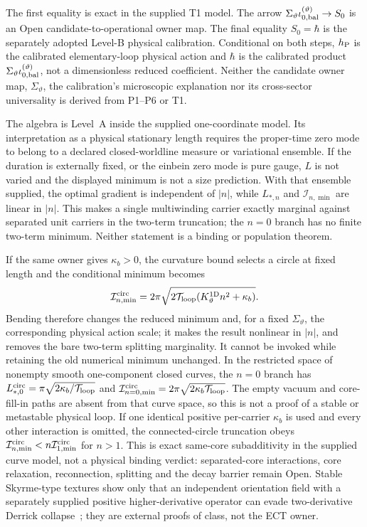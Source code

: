 \documentclass[11pt,a4paper]{article}
\begin{document}
The first equality is exact in the supplied T1 model.  The arrow
$\Sigma_\vartheta\iota_{0,\rm bal}^{(\vartheta)}\to S_0$ is an Open
candidate-to-operational owner map.  The final equality $S_0=\hbar$ is the
separately adopted Level-B physical calibration.  Conditional on both steps,
$h_{\rm P}$ is the calibrated elementary-loop physical action and $\hbar$ is
the calibrated product
$\Sigma_\vartheta\iota_{0,\rm bal}^{(\vartheta)}$, not a dimensionless reduced
coefficient.  Neither the candidate owner map, $\Sigma_\vartheta$, the
calibration's microscopic explanation nor its cross-sector universality is
derived from P1--P6 or T1.

The algebra is Level~A inside the supplied one-coordinate model.  Its
interpretation as a physical stationary length requires the proper-time zero
mode to belong to a declared closed-worldline measure or variational
ensemble.  If the duration is externally fixed, or the einbein zero mode is
pure gauge, $L$ is not varied and the displayed minimum is not a size
prediction.  With that ensemble supplied, the optimal gradient is independent
of $|n|$, while $L_{*,n}$ and $\mathcal I_{n,\min}$ are linear in $|n|$.  This makes a
single multiwinding carrier exactly marginal against separated unit carriers
in the two-term truncation; the $n=0$ branch has no finite two-term minimum.
Neither statement is a binding or population theorem.

If the same owner gives $\kappa_b>0$, the curvature bound selects a circle at
fixed length and the conditional minimum becomes
\begin{equation}
 \mathcal I_{n,\min}^{\rm circ}
 =2\pi\sqrt{2\mathcal T_{\rm loop}
 (K_\vartheta^{1\mathrm D}n^2+\kappa_b)} .
 \label{eq:pop_bending_min}
\end{equation}
Bending therefore changes the reduced minimum and, for a fixed
$\Sigma_\vartheta$, the corresponding physical action scale; it makes the
result nonlinear in $|n|$, and removes the bare two-term splitting marginality.  It cannot be
invoked while retaining the old numerical minimum unchanged.  In the
restricted space of nonempty smooth one-component closed curves, the $n=0$
branch has
$L_{*,0}^{\rm circ}=\pi\sqrt{2\kappa_b/\mathcal T_{\rm loop}}$ and
$\mathcal I_{n=0,\min}^{\rm circ}=2\pi\sqrt{2\kappa_b\mathcal T_{\rm loop}}$.
The empty vacuum and core-fill-in paths are absent from that curve space, so
this is not a proof of a stable or metastable physical loop.  If one
identical positive per-carrier $\kappa_b$ is used and every other interaction
is omitted, the connected-circle truncation obeys
$\mathcal I_{n,\min}^{\rm circ}<n\mathcal I_{1,\min}^{\rm circ}$ for $n>1$.  This is exact
same-core subadditivity in the supplied curve model, not a physical binding
verdict: separated-core interactions, core relaxation, reconnection,
splitting and the decay barrier remain Open.  Stable Skyrme-type textures show only
that an independent orientation field with a separately supplied positive
higher-derivative operator can evade two-derivative Derrick
collapse~\cite{Skyrme1961Nonlinear}; they are external proofs of class, not
the ECT owner.
\end{document}
